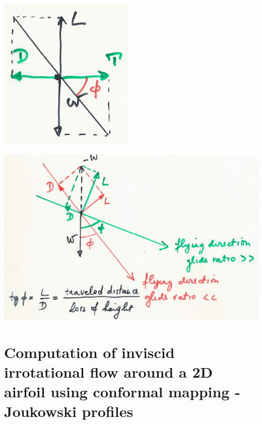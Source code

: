 \documentclass[british,french,11pt, a4paper, openany]{article}
\begin{document}
\begin{center}
	\begin{minipage}{0.3\textwidth}
		\includegraphics[scale=0.5]{ch2/22}
		\label{fig:2.21}
	\end{minipage}
	\begin{minipage}{0.5\textwidth}
		\includegraphics[scale=0.2]{ch2/23}
		\label{fig:2.22}
	\end{minipage}
\end{center}

\section{Computation of inviscid irrotational flow around a 2D airfoil using conformal
	mapping - Joukowski profiles}
\end{document}
